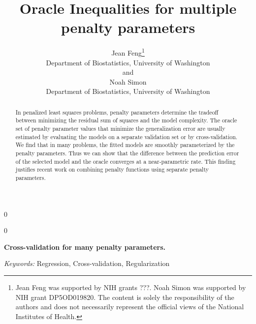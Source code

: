 \documentclass[12pt]{article}
\newcommand{\blind}{0}
\begin{document}
%

\def\spacingset#1{\renewcommand{\baselinestretch}%
{#1}\small\normalsize} \spacingset{1}



\blind
{
  \title{\bf Oracle Inequalities for multiple penalty parameters}
  \author{Jean Feng\thanks{
    Jean Feng was supported by NIH grants ???. %
    Noah Simon was supported by NIH grant DP5OD019820.
    The content is solely the responsibility of the authors and does not necessarily represent the official views of the National Institutes of Health.}\\
    Department of Biostatistics, University of Washington\\
    and \\
    Noah Simon \\
    Department of Biostatistics, University of Washington}
  \maketitle
} \fi

\blind
{
  \bigskip
  \bigskip
  \bigskip
  \begin{center}
    {\LARGE\bf Cross-validation for many penalty parameters.}
\end{center}
  \medskip
} \fi

\bigskip
\begin{abstract}

In penalized least squares problems, penalty parameters determine the tradeoff between minimizing the residual sum of squares and the model complexity. The oracle set of penalty parameter values that minimize the generalization error are usually estimated by evaluating the models on a separate validation set or by cross-validation. We find that in many problems, the fitted models are smoothly parameterized by the penalty parameters. Thus we can show that the difference between the prediction error of the selected model and the oracle converges at a near-parametric rate. This finding justifies recent work on combining penalty functions using separate penalty parameters.

\end{abstract}

\noindent%
{\it Keywords:}  Regression, Cross-validation, Regularization
\vfill

\newpage
\spacingset{1.45} %
\end{document}
